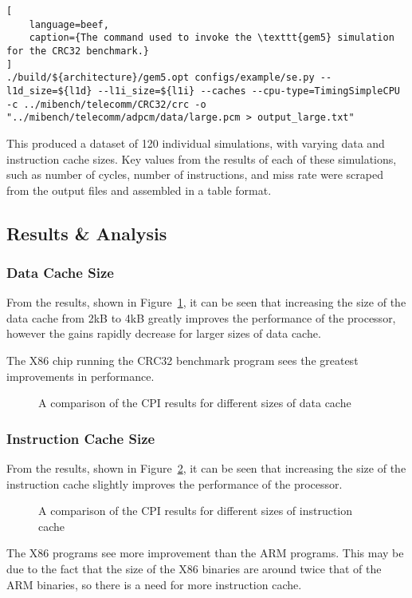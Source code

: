 \begin{lstlisting}[
    language=beef,
    caption={The command used to invoke the \texttt{gem5} simulation for the CRC32 benchmark.}
]
./build/${architecture}/gem5.opt configs/example/se.py --l1d_size=${l1d} --l1i_size=${l1i} --caches --cpu-type=TimingSimpleCPU -c ../mibench/telecomm/CRC32/crc -o "../mibench/telecomm/adpcm/data/large.pcm > output_large.txt"
\end{lstlisting}

This produced a dataset of 120 individual simulations, with varying data and instruction
cache sizes.
Key values from the results of each of these simulations, such as number of cycles,
number of instructions, and miss rate were scraped from the output files and assembled
in a table format.

\subsection{Results \& Analysis}

\subsubsection{Data Cache Size}

From the results, shown in Figure~\ref{fig:parta-l1d},
it can be seen that increasing the size of the data cache from 2kB to
4kB greatly improves the performance of the processor, however the gains rapidly
decrease for larger sizes of data cache.

The X86 chip running the CRC32 benchmark program sees the greatest improvements in
performance.

\begin{figure}[H]
    \centering
    
    \caption{A comparison of the CPI results for different sizes of data cache}
    \label{fig:parta-l1d}
\end{figure}

\subsubsection{Instruction Cache Size}

From the results, shown in Figure~\ref{fig:parta-l1i},
it can be seen that increasing the size of the instruction cache
slightly improves the performance of the processor.

\begin{figure}[H]
    \centering
    
    \caption{A comparison of the CPI results for different sizes of instruction cache}
    \label{fig:parta-l1i}
\end{figure}

The X86 programs see more improvement than the ARM programs.
This may be due to the fact that the size of the X86 binaries are around twice that of
the ARM binaries, so there is a need for more instruction cache.
